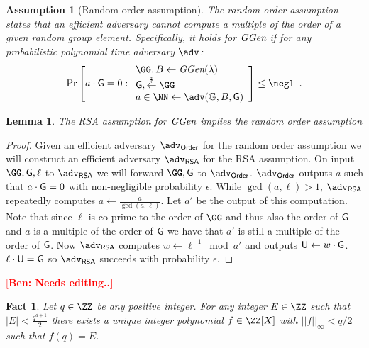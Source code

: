 \documentclass[12pt]{article}
\theoremstyle{Definition}
\newtheorem{lemma}{Lemma}
\newtheorem{assumption}{Assumption}
\newtheorem{fact}{Fact}
\newcommand{\ben}[1]{{\textcolor{red}{[\bf Ben: #1]}}}
\newcommand{\ben}[1]{}
\begin{document}
\begin{assumption}[Random order assumption]
	The random order assumption states that an efficient adversary cannot compute a multiple of the order of a given random group element. Specifically, it holds for $\textit{GGen}$ if for any probabilistic polynomial time adversary $\adv$:
	\[
    \Pr\left[a\cdot \Generator =0:
    \begin{array}{l}
         \GG,B \leftarrow \ggen(\lambda)  \\
         \Generator, \sample \GG\\
         a \in \NN \leftarrow \adv(\mathbb{G},B, \Generator) \\
    \end{array}\right] \leq \negl \enspace .
    \]
\end{assumption}
\begin{lemma}
\label{lem:roa-to-rsa}
	The RSA assumption for $\textit{GGen}$ implies the random order assumption
	\end{lemma}
\begin{proof}
	Given an efficient adversary $\adv_{\textsf{Order}}$ for the random order assumption we will construct an efficient adversary $\adv_{\textsf{RSA}}$ for the RSA assumption. On input $\GG,\Generator,\ell$ to $\adv_{\textsf{RSA}}$ we will forward $\GG,\Generator$ to $\adv_{\textsf{Order}}$. $\adv_{\textsf{Order}}$ outputs $a$ such that $a\cdot \mathsf{G}=0$ with non-negligible probability $\epsilon$. 
	While $\gcd(a,\ell)>1$, $\adv_{\textsf{RSA}}$ repeatedly computes $a\gets \frac{a}{\gcd(a,\ell)}$. Let $a'$ be the output of this computation. Note that since $\ell$ is co-prime to the order of $\GG$ and thus also the order of $\mathsf{G}$ and $a$ is a multiple of the order of $\mathsf{G}$ we have that $a'$ is still a multiple of the order of $\mathsf{G}$. Now $\adv_{\textsf{RSA}}$ computes $w\gets \ell^{-1} \bmod a'$ and outputs $\mathsf{U} \gets w\cdot \mathsf{G}$. $\ell \cdot \mathsf{U}=\mathsf{G}$ so $\adv_{\textsf{RSA}}$ succeeds with probability $\epsilon$.
\end{proof}

\ben{Needs editing..}

\begin{fact}
\label{fact:encoding}
Let $q \in \ZZ$ be any positive integer. For any integer $E \in \ZZ$ such that $|E|<\frac{q^{d+1}}{2}$ there exists a unique integer polynomial $f \in \ZZ[X]$ with $||f||_\infty < q/2$ such that $f(q) = E$. 
\end{fact} 
\end{document}
